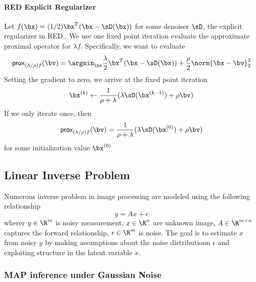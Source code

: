 \documentclass[../writeup.tex]{subfiles}
\begin{document}
\paragraph{RED Explicit Regularizer}

Let $f(\bx) = (1/2)\bx^T(\bx-\sD(\bx))$ for some denoiser $\sD$, the explicit regularizer in RED.\cite{romanoLittleEngineThat2016}. We use one fixed point iteration evaluate the approximate proximal operator for $\lambda f$. Specifically, we want to evaluate 
\[
    \prox_{(\lambda/\rho)f} (\bv)
        = \argmin_{\bx} \frac{\lambda}{2}\bx^T(\bx-\sD(\bx)) + \frac{\rho}{2} \norm{\bx-\bv}_2^2
\]
Setting the gradient to zero, we arrive at the fixed point iteration
\[
    \bx^{(k)} \leftarrow \frac{1}{\rho+\lambda}(
        \lambda \sD(\bx^{(k-1)}) + \rho \bv
    )
\]
If we only iterate once, then 
\[
    \prox_{(\lambda/\rho)f} (\bv)
        = \frac{1}{\rho+\lambda}( \lambda \sD(\bx^{(0)}) + \rho \bv )
\]
for some initialization value $\bx^{(0)}$



\subsection{Linear Inverse Problem}

Numerous inverse problem in image processing are modeled using the following relationship
\[
    y = Ax + \epsilon   
\]
wherer $y\in\R^m$ is noisy measurement, $x\in\R^n$ are unknown image, $A \in \R^{m\times n}$ captures the forward relationship, $\epsilon\in\R^m$ is noise. The goal is to estimate $x$ from noisy $y$ by making assumptions about the noise distributioon $\epsilon$ and exploiting structure in the latent variable $x$.


\subsubsection{MAP inference under Gaussian Noise}
\end{document}
